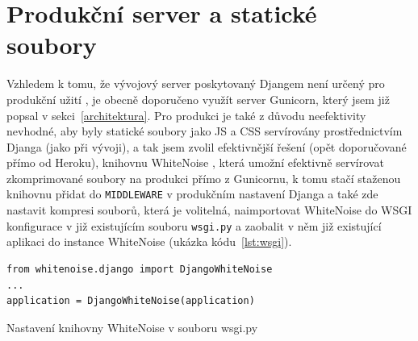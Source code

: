     \section{Produkční server a statické soubory}
    Vzhledem k tomu, že vývojový server poskytovaný Djangem není určený pro produkční užití \cite{django-managepy}, je obecně doporučeno využít server Gunicorn, který jsem již popsal v sekci~\ref{architektura}. Pro produkci je také z důvodu neefektivity nevhodné, aby byly statické soubory jako JS a CSS servírovány prostřednictvím Djanga (jako při vývoji), a tak jsem zvolil efektivnější řešení (opět doporučované přímo od Heroku), knihovnu WhiteNoise \cite{whitenoise}, která umožní efektivně servírovat zkomprimované soubory na produkci přímo z Gunicornu, k tomu stačí staženou knihovnu přidat do \verb|MIDDLEWARE| v produkčním nastavení Djanga a také zde nastavit kompresi souborů, která je volitelná, naimportovat WhiteNoise do WSGI konfigurace v již existujícím souboru \verb|wsgi.py| a zaobalit v něm již existující aplikaci do instance WhiteNoise (ukázka kódu~\ref{lst:wsgi}).
    
    \begin{listing}[ht]
    	\begin{verbatim}
from whitenoise.django import DjangoWhiteNoise
...
application = DjangoWhiteNoise(application)
    	\end{verbatim}
    	\caption{Nastavení knihovny WhiteNoise v souboru wsgi.py}\label{lst:wsgi}
    \end{listing}
    
